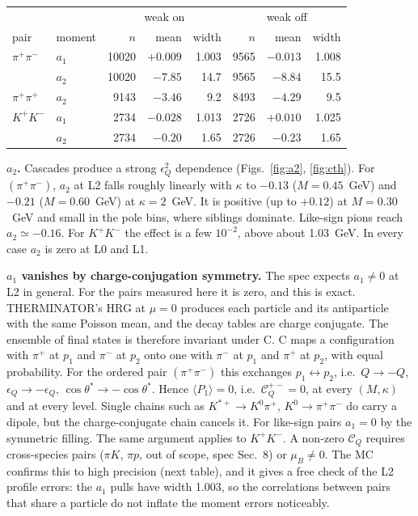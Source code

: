 \documentclass[11pt,a4paper]{article}
\newcommand{\CQ}{\mathcal C_Q}
\begin{document}
\begin{table}[H]
\centering\small
\begin{tabular}{llrrrrrr}
\toprule
& & \multicolumn{3}{c}{weak on} & \multicolumn{3}{c}{weak off} \\
pair & moment & $n$ & mean & width & $n$ & mean & width \\
\midrule
$\pi^+\pi^-$ & $a_1$ & 10020 & $+0.009$ & 1.003 & 9565 & $-0.013$ & 1.008 \\
             & $a_2$ & 10020 & $-7.85$ & 14.7 & 9565 & $-8.84$ & 15.5 \\
$\pi^+\pi^+$ & $a_2$ & 9143 & $-3.46$ & 9.2 & 8493 & $-4.29$ & 9.5 \\
$K^+K^-$     & $a_1$ & 2734 & $-0.028$ & 1.013 & 2726 & $+0.010$ & 1.025 \\
             & $a_2$ & 2734 & $-0.20$ & 1.65 & 2726 & $-0.23$ & 1.65 \\
\bottomrule
\end{tabular}
\end{table}

\noindent\textbf{$a_2$.} Cascades produce a strong $\epsilon_Q^2$ dependence (Figs.~\ref{fig:a2},
\ref{fig:cth}). For $(\pi^+\pi^-)$, $a_2$ at L2 falls roughly linearly with $\kappa$ to $-0.13$
($M=0.45$~GeV) and $-0.21$ ($M=0.60$~GeV) at $\kappa=2$~GeV. It is positive (up to $+0.12$) at
$M=0.30$~GeV and small in the pole bins, where siblings dominate. Like-sign pions reach
$a_2\simeq-0.16$. For $K^+K^-$ the effect is a few $10^{-2}$, above about 1.03~GeV. In every case
$a_2$ is zero at L0 and L1.

\noindent\textbf{$a_1$ vanishes by charge-conjugation symmetry.} The spec expects $a_1\ne0$ at L2
in general. For the pairs measured here it is zero, and this is exact. THERMINATOR's HRG at
$\mu=0$ produces each particle and its antiparticle with the same Poisson mean, and the decay tables
are charge conjugate. The ensemble of final states is therefore invariant under C. C maps a
configuration with $\pi^+$ at $p_1$ and $\pi^-$ at $p_2$ onto one with $\pi^-$ at $p_1$ and
$\pi^+$ at $p_2$, with equal probability. For the ordered pair $(\pi^+\pi^-)$ this exchanges
$p_1\leftrightarrow p_2$, i.e.\ $Q\to-Q$, $\epsilon_Q\to-\epsilon_Q$, $\cos\theta^*\to-\cos\theta^*$.
Hence $\langle P_1\rangle=0$, i.e.\ $\CQ^{+-}=0$, at every $(M,\kappa)$ and at every level. Single
chains such as $K^{*+}\to K^0\pi^+$, $K^0\to\pi^+\pi^-$ do carry a dipole, but the
charge-conjugate chain cancels it. For like-sign pairs $a_1=0$ by the symmetric filling. The same
argument applies to $K^+K^-$. A non-zero $\CQ$ requires cross-species pairs ($\pi K$, $\pi p$, out
of scope, spec Sec.~8) or $\mu_B\neq0$. The MC confirms this to high precision (next table), and
it gives a free check of the L2 profile errors: the $a_1$ pulls have width 1.003, so the
correlations between pairs that share a particle do not inflate the moment errors noticeably.
\end{document}
